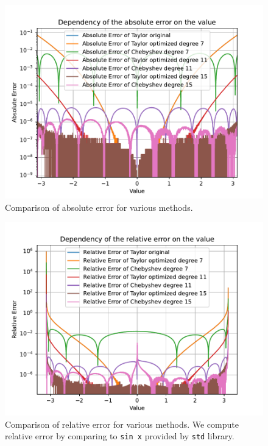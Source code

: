 \documentclass[12pt]{article}
\begin{document}
\begin{figure}[h]
  \centering
  \includegraphics[width=\textwidth]{plots/accuracy/inc_abs_pi_001.pdf}
  \caption{Comparison of absolute error for various methods.}
  \label{fig:abs_error}
\end{figure}

\begin{figure}[h]
  \centering
  \includegraphics[width=\textwidth]{plots/accuracy/inc_rel_pi_001.pdf}
  \caption{Comparison of relative error for various methods. We compute relative error by comparing to \texttt{sin x} provided by \texttt{std} library.}
  \label{fig:rel_error}
\end{figure}
\end{document}
